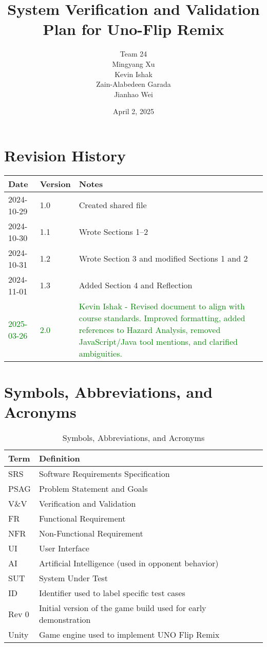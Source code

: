 \documentclass[12pt]{article}
\title{System Verification and Validation Plan for Uno-Flip Remix}
\author{Team 24 \\ Mingyang Xu \\ Kevin Ishak \\ Zain-Alabedeen Garada \\ Jianhao Wei \\ \removed{Andy Liang}}
\date{April 2, 2025}
\newcommand{\added}[1]{\textcolor{green}{#1}}
\begin{document}
\maketitle

\tableofcontents
\listoftables
\newpage

\section*{Revision History}
\begin{longtable}{|p{3cm}|p{2cm}|p{9cm}|}
\hline
\textbf{Date} & \textbf{Version} & \textbf{Notes} \\
\hline
2024-10-29 & 1.0 & Created shared file \\
\hline
2024-10-30 & 1.1 & Wrote Sections 1--2 \\
\hline
2024-10-31 & 1.2 & Wrote Section 3 and modified Sections 1 and 2 \\
\hline
2024-11-01 & 1.3 & Added Section 4 and Reflection \\
\hline
\added{2025-03-26} & \added{2.0} & \added{Kevin Ishak - Revised document to align with course standards. Improved formatting, added references to Hazard Analysis, removed JavaScript/Java tool mentions, and clarified ambiguities.} \\
\hline
\end{longtable}

\newpage

\section{Symbols, Abbreviations, and Acronyms}

\begin{table}[H]
\centering
\caption{Symbols, Abbreviations, and Acronyms}
\begin{tabular}{|p{3cm}|p{10cm}|}
\hline
\textbf{Term} & \textbf{Definition} \\
\hline
SRS & Software Requirements Specification \\
\hline
PSAG & Problem Statement and Goals \\
\hline
V\&V & Verification and Validation \\
\hline
FR & Functional Requirement \\
\hline
NFR & Non-Functional Requirement \\
\hline
UI & User Interface \\
\hline
AI & Artificial Intelligence (used in opponent behavior) \\
\hline
SUT & System Under Test \\
\hline
ID & Identifier used to label specific test cases \\
\hline
Rev 0 & Initial version of the game build used for early demonstration \\
\hline
Unity & Game engine used to implement UNO Flip Remix \\
\hline
\end{tabular}
\end{table}
\end{document}
